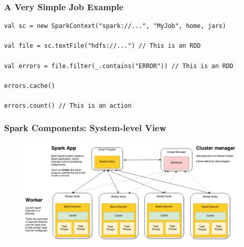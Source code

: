 
\begin{frame}[fragile]
\frametitle{A Very Simple Job Example}


\begin{lstlisting}
val sc = new SparkContext("spark://...", "MyJob", home, jars) 

val file = sc.textFile("hdfs://...") // This is an RDD

val errors = file.filter(_.contains("ERROR")) // This is an RDD

errors.cache()

errors.count() // This is an action
\end{lstlisting}

\end{frame}

\begin{frame}
\frametitle{Spark Components: System-level View}
	\begin{figure}[h]
	  \centering
	  \includegraphics[scale=0.3]{./Figures/spark_system}
	  \label{fig:spark_components}
	\end{figure}
\end{frame}

